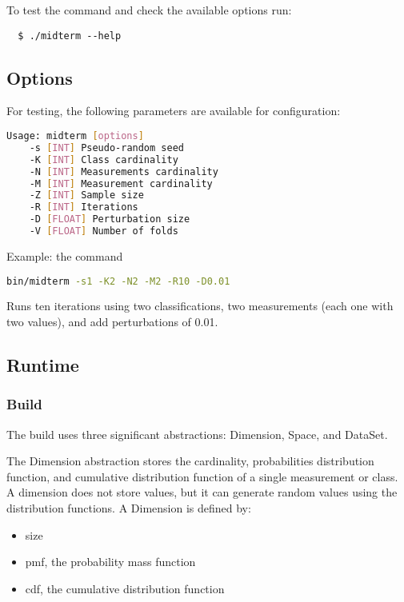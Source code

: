\documentclass[letterpaper, conference]{IEEEtran}
\begin{document}
To test the command and check the available options run:

\begin{verbatim}
  $ ./midterm --help
\end{verbatim}

\subsection{Options}

For testing, the following parameters are available for configuration:

\begin{lstlisting}[language=sh]
  Usage: midterm [options]
    -s [INT] Pseudo-random seed
    -K [INT] Class cardinality
    -N [INT] Measurements cardinality
    -M [INT] Measurement cardinality 
    -Z [INT] Sample size
    -R [INT] Iterations
    -D [FLOAT] Perturbation size
    -V [FLOAT] Number of folds
\end{lstlisting}

Example: the command

\begin{lstlisting}[language=sh]
  bin/midterm -s1 -K2 -N2 -M2 -R10 -D0.01
\end{lstlisting}

Runs ten iterations using two classifications, two measurements (each one with two values), and add perturbations of 0.01.

\subsection{Runtime}

\subsubsection{Build}

The build uses three significant abstractions: Dimension, Space, and DataSet.

The Dimension abstraction stores the cardinality, probabilities distribution function, and cumulative distribution function of a single measurement or class. A dimension does not store values, but it can generate random values using the distribution functions. A Dimension is defined by:

\begin{itemize}
  \item size
  \item pmf, the probability mass function
  \item cdf, the cumulative distribution function
\end{itemize}
\end{document}
